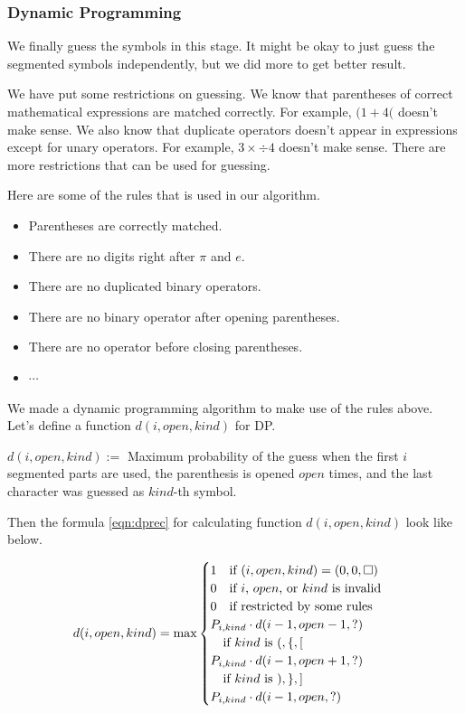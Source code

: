\documentclass[10pt,twocolumn,letterpaper]{article}
\begin{document}
\subsubsection{Dynamic Programming}

We finally guess the symbols in this stage.
It might be okay to just guess the segmented symbols independently,
but we did more to get better result.

We have put some restrictions on guessing.
We know that parentheses of correct mathematical expressions are matched correctly.
For example, $(1 + 4($ doesn't make sense.
We also know that duplicate operators doesn't appear in expressions except for
unary operators. For example, $3 \times \div 4$ doesn't make sense.
There are more restrictions that can be used for guessing.

Here are some of the rules that is used in our algorithm.
\begin{itemize}
\item Parentheses are correctly matched.
\item There are no digits right after $\pi$ and $e$.
\item There are no duplicated binary operators.
\item There are no binary operator after opening parentheses.
\item There are no operator before closing parentheses.
\item $\cdots$
\end{itemize}

We made a dynamic programming algorithm to make use of the rules above.
Let's define a function $d(i, open, kind)$ for DP.

$d(i, open, kind) := $ Maximum probability of the guess
when the first $i$ segmented parts are used, the parenthesis is opened $open$ times, and
the last character was guessed as $kind$-th symbol.

Then the formula \ref{eqn:dprec} for calculating function $d(i, open, kind)$ look like below.

\begin{equation}
\label{eqn:dprec}
d(i, open, kind) = \max
\begin{cases}
1 \text{\quad if $(i,open,kind) = (0,0,\Box)$ } \\
0 \text{\quad if $i$, $open$, or $kind$ is invalid} \\
0 \text{\quad if restricted by some rules} \\
P_{i,kind} \cdot d(i-1, open-1, ?) \\
\text{\quad if $kind$ is $(, \{, [$ } \\
P_{i,kind} \cdot d(i-1, open+1, ?) \\
\text{\quad if $kind$ is $), \}, ]$ } \\
P_{i,kind} \cdot d(i-1, open, ?) \\
\end{cases}
\end{equation}
\end{document}
